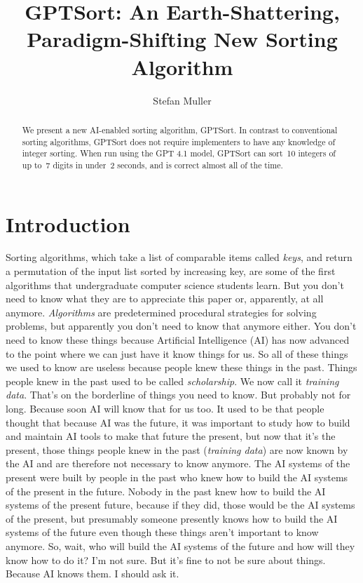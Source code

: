 \documentclass[sigconf]{acmart}\settopmatter{printfolios=false,printccs=false,printacmref=false}
\theoremstyle{definition}
\begin{document}
\title{GPTSort: An Earth-Shattering, Paradigm-Shifting New Sorting Algorithm}


\author{Stefan Muller}

\begin{abstract}
  We present a new AI-enabled sorting algorithm, GPTSort.
  In contrast to conventional sorting algorithms, GPTSort does not
  require implementers to have any knowledge of integer sorting.
  When run using the GPT 4.1 model, GPTSort can sort~10 integers of up to~7
  digits in under~2 seconds, and is correct almost all of the time.
\end{abstract}

\maketitle

\section{Introduction}
Sorting algorithms, which take a list of comparable items called {\em keys},
and return a permutation of the input list sorted by increasing key,
are some of the first algorithms that undergraduate computer science
students learn.
%
But you don't need to know what they are to appreciate this paper or,
apparently, at all anymore.
%
{\em Algorithms} are predetermined procedural strategies for solving
problems, but apparently you don't need to know that anymore either.
%
You don't need to know these things because Artificial Intelligence (AI)
has now advanced to the point where we can just have it know things for us.
%
So all of these things we used to know are useless because people knew these
things in the past.
%
Things people knew in the past used to be called {\em scholarship}.
%
We now call it {\em training data}.
%
That's on the borderline of things you need to know.
%
But probably not for long.
%
Because soon AI will know that for us too.
%
It used to be that people thought that because AI was the future, it was
important to study how to build and maintain AI tools to make that future
the present, but now that it's the present, those things people knew in the
past ({\em training data}) are now known by the AI and are therefore not
necessary to know anymore.
%
The AI systems of the present were built by people in the past who knew
how to build the AI systems of the present in the future.
%
Nobody in the past knew how to build the AI systems of the present future,
because if they did, those would be the AI systems of the present, but
presumably someone presently knows how to build the AI systems of the future
even though these things aren't important to know anymore.
%
So, wait, who will build the AI systems of the future and how will they know
how to do it?
%
I'm not sure.
%
But it's fine to not be sure about things.
%
Because AI knows them.
%
I should ask it.
\end{document}
